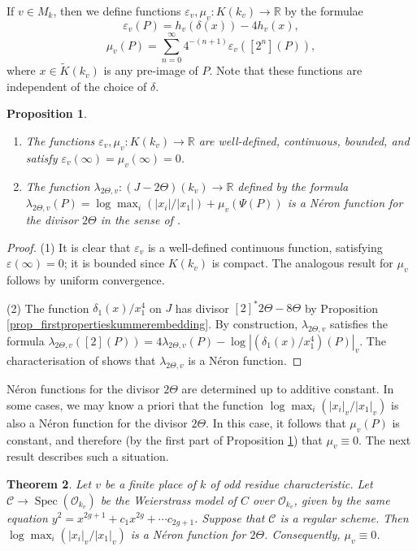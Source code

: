 \documentclass{article} %
\newtheorem{proposition}{Proposition}[section]
\newtheorem{theorem}[proposition]{Theorem}
\numberwithin{equation}{section}
\DeclareMathOperator{\Spec}{Spec}
\renewcommand{\O}{\mathcal{O}}
\newcommand{\R}{\mathbb{R}}
\begin{document}
If $v \in M_k$, then we define functions $\varepsilon_v, \mu_v : K(k_v) \to \R$ by the formulae
\[ \varepsilon_v(P) =  h_v(\delta(x)) - 4 h_v(x), \]
\[ \mu_v(P) = \sum_{n=0}^\infty 4^{-(n+1)} \varepsilon_v([2^n](P)), \]
where $x \in \widetilde{K}(k_v)$ is any pre-image of $P$. Note that these functions are independent of the choice of $\delta$. 
\begin{proposition}\label{prop_local_height_difference}
    \begin{enumerate} \item The functions $\varepsilon_v, \mu_v : K(k_v) \to \R$ are well-defined, continuous, bounded, and satisfy $\varepsilon_v(\infty) = \mu_v(\infty) = 0$.
    \item The function $\lambda_{2 \Theta, v} : (J - 2 \Theta)(k_v) \to \R$ defined by the  formula $\lambda_{2 \Theta, v}(P) = \log \max_i( |x_i| / |x_1| ) + \mu_v(\Psi(P))$ is a N\'eron function for the divisor $2 \Theta$ in the sense of \cite[Ch. 11, Theorem 1.1]{Lan83}.
    \end{enumerate} 
\end{proposition}
\begin{proof}
    (1) It is clear that $\varepsilon_v$ is a well-defined continuous function, satisfying $\varepsilon(\infty)  = 0$; it is bounded since $K(k_v)$ is compact. The analogous result for $\mu_v$ follows by uniform convergence.

    (2) The function $\delta_1(x) / x_1^4$ on $J$ has divisor $[2]^\ast 2 \Theta - 8 \Theta$ by Proposition \ref{prop_firstpropertieskummerembedding}. By construction, $\lambda_{2 \Theta, v}$ satisfies the formula $\lambda_{2 \Theta, v}([2](P)) = 4 \lambda_{2 \Theta, v}(P) - \log |(\delta_1(x) / x_1^4)(P)|_v$. The characterisation of \cite[Ch. 11, Proposition 1.4]{Lan83} shows that $\lambda_{2 \Theta, v}$ is a N\'eron function. 
\end{proof}
N\'eron functions for the divisor $2 \Theta$ are determined up to additive constant. In some cases, we may know a priori that the function $\log \max_i( |x_i|_v / |x_1|_v )$ is also a N\'eron function for the divisor $2 \Theta$. In this case, it follows that $\mu_v(P)$ is constant, and therefore (by the first part of Proposition \ref{prop_local_height_difference}) that $\mu_v \equiv 0$. 
The next result describes such a situation. 
\begin{theorem}\label{theorem_weierstrassmodelregular_muv_zero}
    Let $v$ be a finite place of $k$ of odd residue characteristic.
    Let $\mathcal{C}\rightarrow \Spec(\O_{k_v})$ be the Weierstrass model of $C$ over $\O_{k_v}$, given by the same equation $y^2 = x^{2g+1}+ c_1x^{2g} +\cdots c_{2g+1}$.
    Suppose that $\mathcal{C}$ is a regular scheme. 
    Then $\log \max_i(|x_i|_v/|x_1|_v)$ is a N\'eron function for $2\Theta$.
    Consequently, $\mu_v\equiv 0$. 
\end{theorem}
\end{document}
